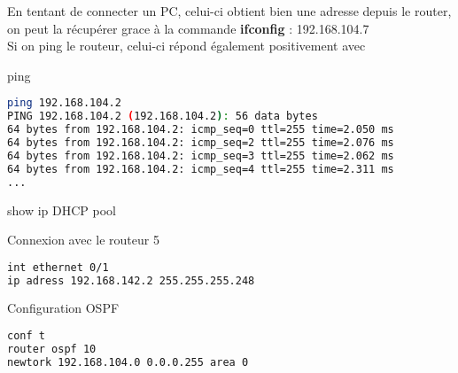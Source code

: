\documentclass[10pt,a4paper]{article}
\begin{document}
En tentant de connecter un PC, celui-ci obtient bien une adresse depuis le router, on peut la récupérer grace à la commande \textbf{ifconfig} : 192.168.104.7 \\
Si on ping le routeur, celui-ci répond également positivement avec 

\noindent ping
\begin{lstlisting}[language=bash]
ping 192.168.104.2
PING 192.168.104.2 (192.168.104.2): 56 data bytes
64 bytes from 192.168.104.2: icmp_seq=0 ttl=255 time=2.050 ms
64 bytes from 192.168.104.2: icmp_seq=2 ttl=255 time=2.076 ms
64 bytes from 192.168.104.2: icmp_seq=3 ttl=255 time=2.062 ms
64 bytes from 192.168.104.2: icmp_seq=4 ttl=255 time=2.311 ms
...
\end{lstlisting}
show ip DHCP pool

\noindent Connexion avec le routeur 5
\begin{lstlisting}[language=bash]
int ethernet 0/1
ip adress 192.168.142.2 255.255.255.248
\end{lstlisting}

\noindent Configuration OSPF
\begin{lstlisting}[language=bash]
conf t
router ospf 10
newtork 192.168.104.0 0.0.0.255 area 0
\end{lstlisting}
\end{document}
